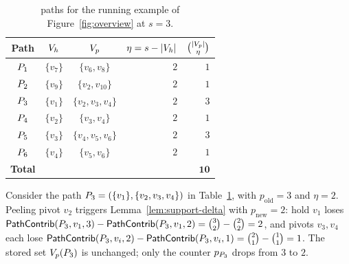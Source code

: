\begin{table}[t]
\centering
\caption{\cpi{} paths for the running example of Figure~\ref{fig:overview} at $s=3$.}
\label{tab:cpi-leaves}
\tiny
\begin{tabular}{cccrr}
\toprule
Path & $V_h$ & $V_p$ & $\eta=s-|V_h|$ & $\binom{|V_p|}{\eta}$ \\
\midrule
$\TPath_1$ & $\{v_7\}$   & $\{v_6,v_8\}$        & $2$ & $1$ \\
$\TPath_2$ & $\{v_9\}$   & $\{v_2,v_{10}\}$     & $2$ & $1$ \\
$\TPath_3$ & $\{v_1\}$   & $\{v_2,v_3,v_4\}$    & $2$ & $3$ \\
$\TPath_4$ & $\{v_2\}$   & $\{v_3,v_4\}$        & $2$ & $1$ \\
$\TPath_5$ & $\{v_3\}$   & $\{v_4,v_5,v_6\}$    & $2$ & $3$ \\
$\TPath_6$ & $\{v_4\}$   & $\{v_5,v_6\}$        & $2$ & $1$ \\
\midrule
\textbf{Total} & & & & $\mathbf{10}$ \\
\bottomrule
\end{tabular}
\end{table}

\begin{example}\label{ex:peel}
Consider the path $\TPath_3=(\{v_1\},\{v_2,v_3,v_4\})$ in Table~\ref{tab:cpi-leaves}, with $p_{\mathrm{old}}=3$ and $\eta=2$. Peeling pivot $v_2$ triggers Lemma~\ref{lem:support-delta} with $p_{\mathrm{new}}=2$: hold $v_1$ loses $\pathContrib(\TPath_3,v_1,3)-\pathContrib(\TPath_3,v_1,2)=\binom{3}{2}-\binom{2}{2}=2$, and pivots $v_3, v_4$ each lose $\pathContrib(\TPath_3,v_i,2)-\pathContrib(\TPath_3,v_i,1)=\binom{2}{1}-\binom{1}{1}=1$. The stored set $\Vp(\TPath_3)$ is unchanged; only the counter $p_{\TPath_3}$ drops from $3$ to $2$.
\end{example}
